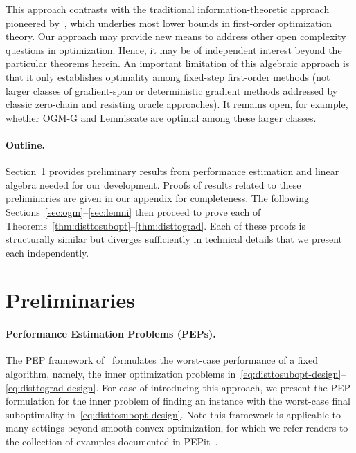 \documentclass[11pt]{article}
\begin{document}
This approach contrasts with the traditional information-theoretic approach pioneered by~\cite{nemirovsky1983problem}, which underlies most lower bounds in first-order optimization theory. Our approach may provide new means to address other open complexity questions in optimization. Hence, it may be of independent interest beyond the particular theorems herein. An important limitation of this algebraic approach is that it only establishes optimality among fixed-step first-order methods (not larger classes of gradient-span or deterministic gradient methods addressed by classic zero-chain and resisting oracle approaches). It remains open, for example, whether OGM-G and Lemniscate are optimal among these larger classes. 

\paragraph{Outline.} Section~\ref{sec:prelim} provides preliminary results from performance estimation and linear algebra needed for our development. Proofs of results related to these preliminaries are given in our appendix for completeness. The following Sections~\ref{sec:ogm}--\ref{sec:lemni} then proceed to prove each of Theorems~\ref{thm:disttosubopt}--\ref{thm:disttograd}. Each of these proofs is structurally similar but diverges sufficiently in technical details that we present each independently.




\section{Preliminaries} \label{sec:prelim}

\paragraph{Performance Estimation Problems (PEPs).}
The PEP framework of~\cite{DT14,THG17,taylor2017composite} formulates the worst-case performance of a fixed algorithm, namely, the inner optimization problems in~\eqref{eq:disttosubopt-design}--\eqref{eq:disttograd-design}. For ease of introducing this approach, we present the PEP formulation for the inner problem of finding an instance with the worst-case final suboptimality in~\eqref{eq:disttosubopt-design}. Note this framework is applicable to many settings beyond smooth convex optimization, for which we refer readers to the collection of examples documented in PEPit~\cite{pepit2022}.
\end{document}
